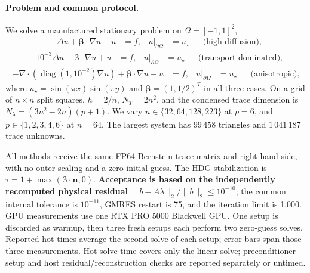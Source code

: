 \paragraph{Problem and common protocol.}
We solve a manufactured stationary problem on $\Omega=[-1,1]^2$,
\begin{equation}
 \begin{aligned}
 -\Delta u+\boldsymbol\beta\cdot\nabla u+u&=f,
 &u|_{\partial\Omega}&=u_\star &&\text{(high diffusion)},
 \end{aligned}
\end{equation}
\begin{equation}
 \begin{aligned}
 -10^{-3}\Delta u+\boldsymbol\beta\cdot\nabla u+u&=f,
 &u|_{\partial\Omega}&=u_\star &&\text{(transport dominated)},
 \end{aligned}
\end{equation}
\begin{equation}
 \begin{aligned}
 -\nabla\cdot\!\left(\operatorname{diag}(1,10^{-2})\nabla u\right)
 +\boldsymbol\beta\cdot\nabla u+u&=f,
 &u|_{\partial\Omega}&=u_\star &&\text{(anisotropic)},
 \end{aligned}
\end{equation}
where $u_\star=\sin(\pi x)\sin(\pi y)$ and
$\boldsymbol\beta=(1,1/2)^T$ in all three cases.
On a grid of $n\times n$ split squares,
$h=2/n$, $N_T=2n^2$, and the condensed trace dimension is
$N_\lambda=(3n^2-2n)(p+1)$.
We vary $n\in\{32,64,128,223\}$ at $p=6$, and
$p\in\{1,2,3,4,6\}$ at $n=64$.
The largest system has $99\,458$ triangles and $1\,041\,187$ trace unknowns.

All methods receive the same FP64 Bernstein trace matrix and right-hand
side, with no outer scaling and a zero initial guess.
The HDG stabilization is $\tau=1+\max(\boldsymbol\beta\!\cdot\boldsymbol n,0)$.
\textbf{Acceptance is based on the independently recomputed physical residual}
$\|b-A\lambda\|_2/\|b\|_2\le10^{-10}$;
the common internal tolerance is $10^{-11}$, GMRES restart is 75, and the
iteration limit is 1,000. GPU measurements use one RTX PRO 5000 Blackwell GPU.
One setup is discarded as warmup, then three fresh setups each perform two
zero-guess solves.  Reported hot times average the second solve of each
setup; error bars span those three measurements.
Hot solve time covers only the linear solve; preconditioner setup and
host residual/reconstruction checks are reported separately or untimed.

